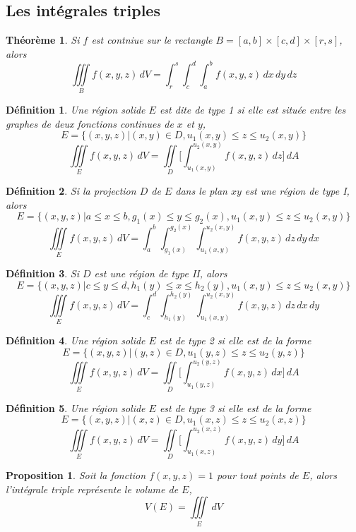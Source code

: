 \documentclass{article}[babel]
\newtheorem{mydef}{Définition}
\newtheorem{myprop}{Proposition}
\newtheorem{mythm}{Théorème}
\begin{document}
	\subsection{Les intégrales triples}
		\begin{mythm}
			Si $f$ est contniue sur le rectangle $B=[a,b]\times[c,d]\times[r,s]$, alors
			\[\iiint\limits_B f(x,y,z)\, dV=\int_r^s\int_c^d\int_a^b f(x,y,z)\, dx\, dy\, dz\]
		\end{mythm}
		\begin{mydef}
			Une région solide $E$ est dite de type 1 si elle est située entre les graphes de deux fonctions continues de $x$ et $y$,
			\[E=\big\{(x,y,z) \vert (x,y)\in D, u_1(x,y)\leq z\leq u_2(x,y) \big\}\]
			\[\iiint\limits_E f(x,y,z)\, dV = \iint\limits_D\bigg[\int_{u_1(x,y)}^{u_2(x,y)}f(x,y,z)\, dz\bigg]\, dA\]
		\end{mydef}
		\begin{mydef}
			Si la projection $D$ de $E$ dans le plan $xy$ est une région de type I, alors
			\[E=\big\{(x,y,z) \vert a\leq x\leq b,g_1(x)\leq y\leq g_2(x), u_1(x,y)\leq z\leq u_2(x,y) \big\}\]
			\[\iiint\limits_E f(x,y,z)\, dV = \int_a^b\int_{g_1(x)}^{g_2(x)}\int_{u_1(x,y)}^{u_2(x,y)}f(x,y,z)\, dz\, dy\, dx\]
		\end{mydef}
		\begin{mydef}
			Si  $D$ est une région de type II, alors
			\[E=\big\{(x,y,z) \vert c\leq y \leq d,h_1(y)\leq x\leq h_2(y), u_1(x,y)\leq z\leq u_2(x,y) \big\}\]
			\[\iiint\limits_E f(x,y,z)\, dV = \int_c^d\int_{h_1(y)}^{h_2(y)}\int_{u_1(x,y)}^{u_2(x,y)}f(x,y,z)\, dz\, dx\, dy\]
		\end{mydef}
		\begin{mydef}
			Une région solide $E$ est de type 2 si elle est de la forme
			\[E=\big\{(x,y,z) \vert  (y,z)\in D, u_1(y,z)\leq z\leq u_2(y,z) \big\}\]
			\[\iiint\limits_E f(x,y,z)\, dV = \iint\limits_D\bigg[ \int_{u_1(y,z)}^{u_2(y,z)}f(x,y,z)\, dx\bigg]\, dA\]
		\end{mydef}
		\begin{mydef}
			Une région solide $E$ est de type 3 si elle est de la forme
			\[E=\big\{(x,y,z) \vert  (x,z)\in D, u_1(x,z)\leq z\leq u_2(x,z) \big\}\]
			\[\iiint\limits_E f(x,y,z)\, dV = \iint\limits_D\bigg[ \int_{u_1(x,z)}^{u_2(x,z)}f(x,y,z)\, dy\bigg]\, dA\]
		\end{mydef}
		\begin{myprop}
		Soit la fonction $f(x,y,z)=1$ pour tout points de $E$, alors l'intégrale triple représente le volume de $E$, \[V(E)=\iiint\limits_E\, dV\]
	\end{myprop}
\end{document}
